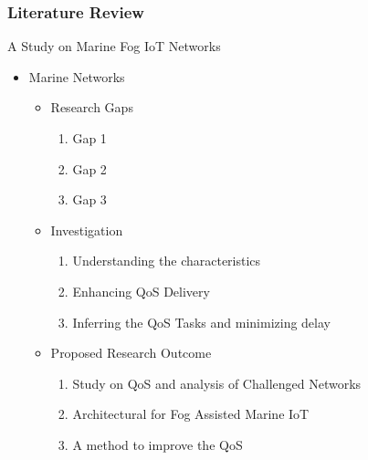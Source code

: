 \documentclass[aspectratio=169,mathserif]{beamer}
\begin{document}
\begin{frame}
\frametitle{Literature Review}
\begin{block}{A Study on Marine Fog IoT Networks}
\begin{itemize}
    \item Marine Networks
        \begin{itemize}
        \item Research Gaps
            \begin{enumerate}
              \item Gap 1
              \item Gap 2
              \item Gap 3
            \end{enumerate}
        \item Investigation
            \begin{enumerate}
              \item Understanding the characteristics
              \item Enhancing QoS Delivery
              \item Inferring the QoS Tasks and minimizing delay \cite{Ref1}
            \end{enumerate}
        \item Proposed Research Outcome
            \begin{enumerate}
              \item Study on QoS and analysis of Challenged Networks \cite{Ref2}
              \item Architectural for Fog Assisted Marine IoT
              \item A method to improve the QoS
          \end{enumerate}
      \end{itemize}
\end{itemize}
\end{block}
\end{frame}
\end{document}
